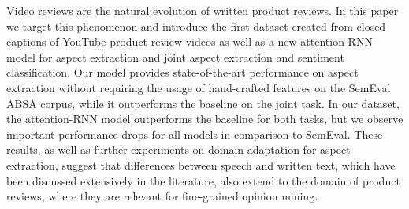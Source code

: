 Video reviews are the natural evolution of written product reviews. In this paper we target this phenomenon and introduce the first dataset created from closed captions of YouTube product review videos as well as a new attention-RNN model for aspect extraction and joint aspect extraction and sentiment classification. Our model provides state-of-the-art performance on aspect extraction without requiring the usage of hand-crafted features on the SemEval ABSA corpus, while it outperforms the baseline on the joint task. In our dataset, the attention-RNN model outperforms the baseline for both tasks, but we observe important performance drops for all models in comparison to SemEval. These results, as well as further experiments on domain adaptation for aspect extraction, suggest that differences between speech and written text, which have been discussed extensively in the literature, also extend to the domain of product reviews, where they are relevant for fine-grained opinion mining.
